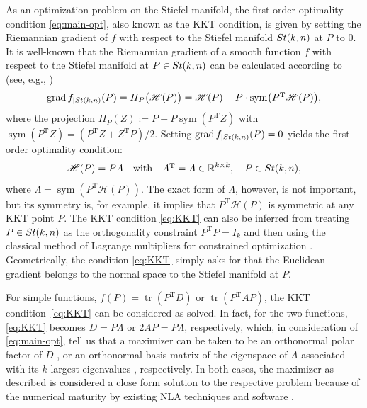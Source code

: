 \documentclass[11pt]{article}
\def\bbR{\mathbb{R}}
\def\scrH{\mathscr{H}}
\newcommand\STM[2]{{\rm St}(#1,#2)}
\DeclareMathOperator{\grad}{grad}
\DeclareMathOperator{\sym}{sym}
\DeclareMathOperator{\tr}{tr}
\DeclareMathOperator{\T}{T}
\theoremstyle{definition}
\numberwithin{equation}{section}
\begin{document}
As an optimization problem on the Stiefel manifold, the first order optimality condition
\eqref{eq:main-opt}, also known as the KKT condition, is given by setting the Riemannian gradient of $f$ with respect to the Stiefel manifold $\STM{k}{n}$ at $P$ to $0$.
%
It is well-known that the Riemannian gradient of a smooth function $f$  with respect to the Stiefel manifold at $P\in\STM{k}{n}$
can be calculated according to (see, e.g., \cite[(3.37)]{abms:2008})
\begin{equation}\label{eq:gradOnStM}
\grad f_{|{\STM{k}{n}}}(P)
  =\Pi_P\big(\scrH(P)\big)
  =\scrH(P)-P \cdot \sym\!\big(P^{\T}\scrH(P)\big),
\end{equation}
where the projection $\Pi_P(Z):=P-P\sym(P^{\T}Z)$ with $\sym(P^{\T}Z)=(P^{\T}Z+Z^{\T}P)/2$. %
Setting $\grad f_{|{\STM{k}{n}}}(P)=0$ yields
the first-order optimality condition:
\begin{equation}\label{eq:KKT}
\scrH(P)=P\Lambda
\quad \mbox{with} \quad
\Lambda^{\T}=\Lambda\in\bbR^{k\times k},\quad P\in\STM{k}{n},
\end{equation}
where
$\Lambda=\sym(P^{\T}\scrH(P))$.
The exact form of $\Lambda$, however, is not important, but its symmetry is, for example, it implies that $P^{\T}\scrH(P)$ is symmetric at any KKT point $P$.
The KKT condition \eqref{eq:KKT} can also be inferred from
treating $P\in\STM{k}{n}$ as the  orthogonality constraint $P^{\T}P=I_k$ and then
using the classical method of Lagrange multipliers for constrained optimization \cite{nowr:2006}.
Geometrically, the condition \eqref{eq:KKT} simply asks for that the Euclidean gradient belongs to the normal space to the Stiefel manifold
at $P$.

For simple functions, $f(P)=\tr(P^{\T}D)$ or $\tr(P^{\T}AP)$, the KKT condition~\eqref{eq:KKT} can be considered as solved.
In fact, for the two functions, \eqref{eq:KKT} becomes
$D=P\Lambda$ or $2AP=P\Lambda$, respectively, which, in consideration of \eqref{eq:main-opt},
tell us that a maximizer can be taken to be an orthonormal polar factor of $D$ \cite{hojo:2013,zhwb:2022},
or an orthonormal basis matrix of the eigenspace of $A$ associated with its $k$ largest eigenvalues \cite{lili:2024,lilb:2013,liwz:2023,stsu:1990}, respectively. In both cases, the maximizer as described
is considered a close form solution to the respective problem because of the numerical maturity by  existing NLA techniques and software
\cite{abbd:1999,bddrv:2000,demm:1997,govl:2013,li:2015,parl:1998}.
\end{document}
